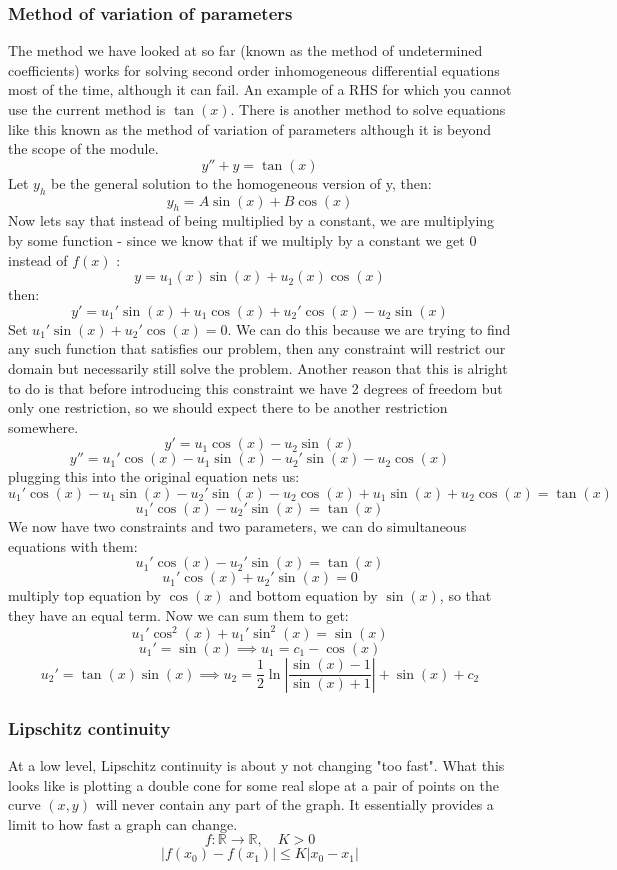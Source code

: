 \documentclass[12pt]{article}
\begin{document}
\subsubsection*{Method of variation of parameters}
The method we have looked at so far (known as the method of undetermined coefficients) works for solving second order inhomogeneous differential equations most of the time, although it can fail. An example of a RHS for which you cannot use the current method is \(\tan(x)\). There is another method to solve equations like this known as the method of variation of parameters although it is beyond the scope of the module.
\[y''+y=\tan(x)\]
Let \(y_h\) be the general solution to the homogeneous version of y, then:
\[y_h=A\sin(x)+B\cos(x)\]
Now lets say that instead of being multiplied by a constant, we are multiplying by some function - since we know that if we multiply by a constant we get 0 instead of \(f(x)\) :
\[y=u_1(x)\sin(x)+u_2(x)\cos(x)\]
then:
\[y'={u_1}'\sin(x)+u_1\cos(x)+{u_2}'\cos(x)-u_2\sin(x)\]
Set \({u_1}'\sin(x)+{u_2}'\cos(x)=0\). We can do this because we are trying to find any such function that satisfies our problem, then any constraint will restrict our domain but necessarily still solve the problem. Another reason that this is alright to do is that before introducing this constraint we have 2 degrees of freedom but only one restriction, so we should expect there to be another restriction somewhere.
\[y'=u_1\cos(x)-u_2\sin(x)\]
\[y''={u_1}'\cos(x)-u_1\sin(x)-{u_2}'\sin(x)-u_2\cos(x)\]
plugging this into the original equation nets us:
\[{u_1}'\cos(x)-u_1\sin(x)-{u_2}'\sin(x)-u_2\cos(x)+u_1\sin(x)+u_2\cos(x)=\tan(x)\]
\[{u_1}'\cos(x)-{u_2}'\sin(x)=\tan(x)\]
We now have two constraints and two parameters, we can do simultaneous equations with them:
\[{u_1}'\cos(x)-{u_2}'\sin(x)=\tan(x)\]
\[{u_1}'\cos(x)+{u_2}'\sin(x)=0\]
multiply top equation by \(\cos(x)\) and bottom equation by \(\sin(x)\), so that they have an equal term. Now we can sum them to get:
\[{u_1}'\cos^2(x)+{u_1}'\sin^2(x)=\sin(x)\]
\[{u_1}'=\sin(x)\implies u_1=c_1-\cos(x)\]
\[{u_2}'=\tan(x)\sin(x)\implies u_2=\frac{1}{2}\ln\left|\frac{\sin(x)-1}{\sin(x)+1}\right|+\sin(x)+c_2\]
\subsubsection*{Lipschitz continuity}
At a low level, Lipschitz continuity is about y not changing "too fast". What this looks like is plotting a double cone for some real slope at a pair of points on the curve \((x,y)\) will never contain any part of the graph. It essentially provides a limit to how fast a graph can change.
\[f:\mathbb{R}\to\mathbb{R},\quad K>0\]
\[\vert f(x_0)-f(x_1)\vert \leq K\vert x_0-x_1\vert\]
\end{document}
